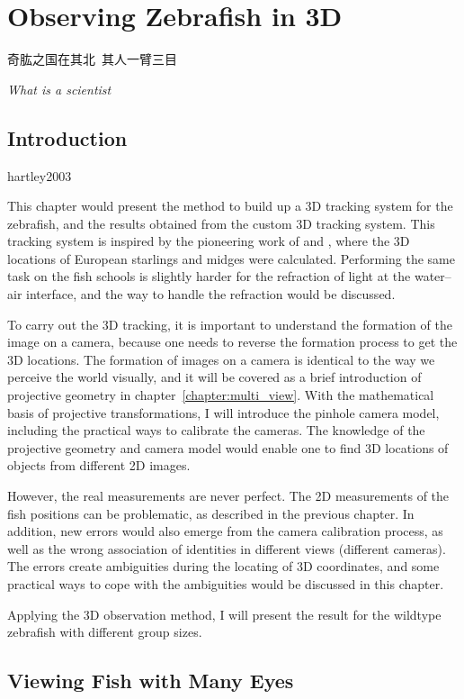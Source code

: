 \documentclass[11pt,twoside]{report}
\begin{document}
\chapter{Observing Zebrafish in 3D}
\label{chapter:fish_3d}

\epigraph{
奇肱之国在其北~其人一臂三目
}{\emph{What is a scientist}}

\section{Introduction}hartley2003

This chapter would present the method to build up a 3D tracking system for the zebrafish, and the results obtained from the custom 3D tracking system. This tracking system is inspired by the pioneering work of \citeauthor{cavagna2008} \cite{cavagna2008} and \citeauthor{kelley2013} \cite{kelley2013}, where the 3D locations of European starlings and midges were calculated. Performing the same task on the fish schools is slightly harder for the refraction of light at the water--air interface, and the way to handle the refraction would be discussed.

To carry out the 3D tracking, it is important to understand the formation of the image on a camera, because one needs to reverse the formation process to get the 3D locations. The formation of images on a camera is identical to the way we perceive the world visually, and it will be covered as a brief introduction of projective geometry in chapter~\ref{chapter:multi_view}. With the mathematical basis of projective transformations, I will introduce the pinhole camera model, including the practical ways to calibrate the cameras. The knowledge of the projective geometry and camera model would enable one to find 3D locations of objects from different 2D images.

However, the real measurements are never perfect. The 2D measurements of the fish positions can be problematic, as described in the previous chapter. In addition, new errors would also emerge from the camera calibration process, as well as the wrong association of identities in different views (different cameras). The errors create ambiguities during the locating of 3D coordinates, and some practical ways to cope with the ambiguities would be discussed in this chapter.

Applying the 3D observation method, I will present the result for the wildtype zebrafish with different group sizes. 


\section{Viewing Fish with Many Eyes}
\end{document}
